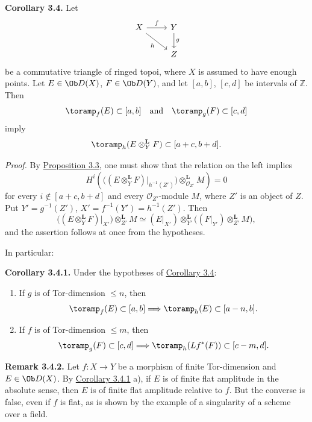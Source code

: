 \textbf{Corollary 3.4.} Let
\[
\begin{tikzcd}
X \arrow[r,"f"] \arrow[dr,"h"'] & Y \arrow[d,"g"]\\
& Z
\end{tikzcd}
\]
be a commutative triangle of ringed topoi, where \(X\) is assumed to have enough points. Let \(E\in\Ob D(X)\), \(F\in\Ob D(Y)\), and let \([a,b]\), \([c,d]\) be intervals of \(\mathbb Z\). Then
\[
  \toramp_f(E)\subset[a,b]\quad\text{and}\quad \toramp_g(F)\subset[c,d]
\]
imply
\[
  \toramp_h(E\otimes_Y^{\mathbf L}F)\subset[a+c,b+d].
\]

\emph{Proof.} By \hyperlink{sga6.e03.prop.3-3}{Proposition 3.3}, one must show that the relation on the left implies
\[
  H^i\left(\bigl((E\otimes_Y^{\mathbf L}F)\vert_{h^{-1}(Z')}\bigr)
    \otimes_{\mathcal O_{Z'}}^{\mathbf L}M\right)=0
\]
for every \(i\notin[a+c,b+d]\) and every \(\mathcal O_{Z'}\)-module \(M\), where \(Z'\) is an object of \(Z\). Put \(Y'=g^{-1}(Z')\), \(X'=f^{-1}(Y')=h^{-1}(Z')\). Then
\[
  \bigl((E\otimes_Y^{\mathbf L}F)\vert_{X'}\bigr)\otimes_{Z'}^{\mathbf L}M
  \simeq
  (E\vert_{X'})\otimes_{Y'}^{\mathbf L}\bigl((F\vert_{Y'})\otimes_{Z'}^{\mathbf L}M\bigr),
\]
and the assertion follows at once from the hypotheses.

In particular:

\textbf{Corollary 3.4.1.} Under the hypotheses of \hyperlink{sga6.e03.cor.3-4}{Corollary 3.4}:
\begin{enumerate}[label=\alph*)]
\item If \(g\) is of Tor-dimension \(\leq n\), then
\[
  \toramp_f(E)\subset[a,b]\Longrightarrow
  \toramp_h(E)\subset[a-n,b].
\]
\item If \(f\) is of Tor-dimension \(\leq m\), then
\[
  \toramp_g(F)\subset[c,d]\Longrightarrow
  \toramp_h(Lf^*(F))\subset[c-m,d].
\]
\end{enumerate}

\textbf{Remark 3.4.2.} Let \(f:X\to Y\) be a morphism of finite Tor-dimension and \(E\in \Ob D(X)\). By \hyperlink{sga6.e03.cor.3-4-1}{Corollary 3.4.1} a), if \(E\) is of finite flat amplitude in the absolute sense, then \(E\) is of finite flat amplitude relative to \(f\). But the converse is false, even if \(f\) is flat, as is shown by the example of a singularity of a scheme over a field.

